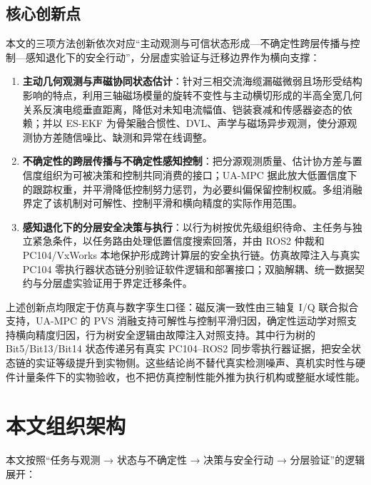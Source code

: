 \subsection{核心创新点}\label{sec:ch01-1-4-2}

本文的三项方法创新依次对应``主动观测与可信状态形成—不确定性跨层传播与控制—感知退化下的安全行动''，分层虚实验证与迁移边界作为横向支撑：

\begin{enumerate}
\def\labelenumi{\arabic{enumi}.}
\item
  \textbf{主动几何观测与声磁协同状态估计}：针对三相交流海缆漏磁微弱且场形受结构影响的特点，利用三轴磁场模量的旋转不变性与主动横切形成的半高全宽几何关系反演电缆垂直距离，降低对未知电流幅值、铠装衰减和传感器姿态的依赖；并以 ES-EKF 为骨架融合惯性、DVL、声学与磁场异步观测，使分源观测协方差随信噪比、缺测和异常在线调整。
\item
  \textbf{不确定性的跨层传播与不确定性感知控制}：把分源观测质量、估计协方差与置信度组织为可被决策和控制共同消费的接口；UA-MPC 据此放大低置信度下的跟踪权重，并平滑降低控制努力惩罚，为必要纠偏保留控制权威。多组消融界定了该机制对可解性、控制平滑和横向精度的实际作用范围。
\item
  \textbf{感知退化下的分层安全决策与执行}：以行为树按优先级组织待命、主任务与独立紧急条件，以任务路由处理低置信度搜索回落，并由 ROS2 仲裁和 PC104/VxWorks 本地保护形成跨计算层的安全执行链。仿真故障注入与真实 PC104 零执行器状态链分别验证软件逻辑和部署接口；双脑解耦、统一数据契约与分层虚实验证用于界定迁移条件。
\end{enumerate}

上述创新点均限定于仿真与数字孪生口径：磁反演一致性由三轴复 I/Q 联合拟合支持，UA-MPC 的 PVS 消融支持可解性与控制平滑归因，确定性运动学对照支持横向精度归因，行为树安全逻辑由故障注入对照支持。其中行为树的 Bit5/Bit13/Bit14 状态传递另有真实 PC104--ROS2 同步零执行器证据，把安全状态链的实证等级提升到实物侧。这些结论尚不替代真实检测噪声、真机实时性与硬件计量条件下的实物验收，也不把仿真控制性能外推为执行机构或整艇水域性能。

\section{本文组织架构}\label{sec:ch01-1-5}

本文按照``任务与观测 → 状态与不确定性 → 决策与安全行动 → 分层验证''的逻辑展开：

